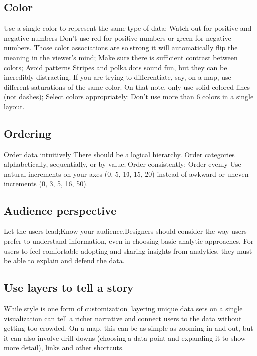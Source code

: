 \documentclass[]{book}
\theoremstyle{definition}
\theoremstyle{definition}
\theoremstyle{definition}
\theoremstyle{remark}
\begin{document}
\subsection{Color}\label{color}

Use a single color to represent the same type of data; Watch out for
positive and negative numbers Don't use red for positive numbers or
green for negative numbers. Those color associations are so strong it
will automatically flip the meaning in the viewer's mind; Make sure
there is sufficient contrast between colors; Avoid patterns Stripes and
polka dots sound fun, but they can be incredibly distracting. If you are
trying to differentiate, say, on a map, use different saturations of the
same color. On that note, only use solid-colored lines (not dashes);
Select colors appropriately; Don't use more than 6 colors in a single
layout.

\subsection{Ordering}\label{ordering}

Order data intuitively There should be a logical hierarchy. Order
categories alphabetically, sequentially, or by value; Order
consistently; Order evenly Use natural increments on your axes (0, 5,
10, 15, 20) instead of awkward or uneven increments (0, 3, 5, 16, 50).

\subsection{Audience perspective}\label{audience-perspective}

Let the users lead;Know your audience,Designers should consider the way
users prefer to understand information, even in choosing basic analytic
approaches. For users to feel comfortable adopting and sharing insights
from analytics, they must be able to explain and defend the data.

\subsection{Use layers to tell a
story}\label{use-layers-to-tell-a-story}

While style is one form of customization, layering unique data sets on a
single visualization can tell a richer narrative and connect users to
the data without getting too crowded. On a map, this can be as simple as
zooming in and out, but it can also involve drill-downs (choosing a data
point and expanding it to show more detail), links and other shortcuts.
\end{document}
